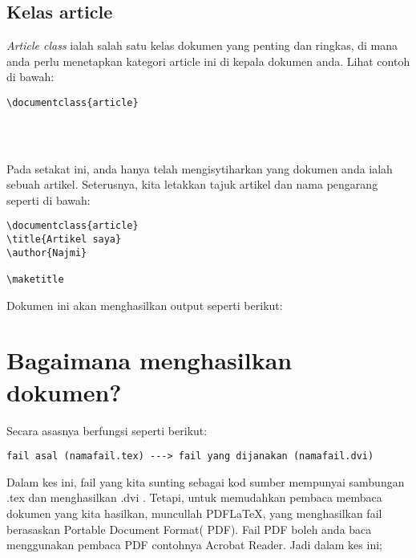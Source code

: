 \subsection{Kelas article}
\emph{Article class} ialah salah satu kelas dokumen yang penting dan ringkas, di mana anda perlu menetapkan kategori article ini di kepala dokumen anda.
Lihat contoh di bawah:\\

\begin{lstlisting}[frame=shadowbox]
\documentclass{article}




\end{lstlisting}

Pada setakat ini, anda hanya telah mengisytiharkan yang dokumen anda ialah sebuah artikel. Seterusnya, kita letakkan tajuk artikel dan nama pengarang
seperti di bawah:\\

\begin{lstlisting}[frame=shadowbox]
\documentclass{article}
\title{Artikel saya}
\author{Najmi}

\maketitle

\end{lstlisting}

\bigskip
Dokumen ini akan menghasilkan output seperti berikut:\\

\begin{minipage}{\linewidth}
\centering
\label{artikel}
\end{minipage}

\section{Bagaimana \latex{} menghasilkan dokumen?}

Secara asasnya \latex{} berfungsi seperti berikut:\\

\begin{Verbatim}[frame=single]
 fail asal (namafail.tex) ---> fail yang dijanakan (namafail.dvi)
\end{Verbatim}

Dalam kes ini, fail yang kita sunting sebagai kod sumber mempunyai sambungan .tex dan menghasilkan .dvi . 
Tetapi, untuk memudahkan pembaca membaca dokumen yang kita hasilkan, muncullah PDFLaTeX, yang menghasilkan fail berasaskan Portable Document Format( PDF).
Fail PDF boleh anda baca menggunakan pembaca PDF contohnya Acrobat Reader. Jadi dalam kes ini;\\

